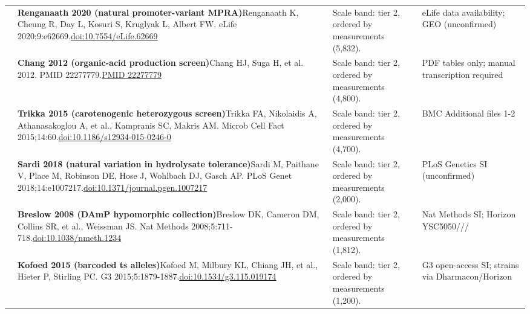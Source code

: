 \begin{landscape}
\begin{longtable}{@{}r@{\hspace{4pt}} L{86mm} L{92mm} L{62mm}@{}}
 & \textbf{Renganaath 2020 (natural promoter-variant MPRA)}\newline Renganaath K, Cheung R, Day L, Kosuri S, Kruglyak L, Albert FW. eLife 2020;9:e62669.\newline \href{https://doi.org/10.7554/eLife.62669}{doi:10.7554/\allowbreak eLife.62669} & Scale band: tier 2, ordered by measurements (5,832). & eLife data availability; GEO (unconfirmed) \\
 & \textbf{Chang 2012 (organic-acid production screen)}\newline Chang HJ, Suga H, et al. 2012. PMID 22277779.\newline \href{https://pubmed.ncbi.nlm.nih.gov/22277779/}{PMID 22277779} & Scale band: tier 2, ordered by measurements (4,800). & PDF tables only; manual transcription required \\
 & \textbf{Trikka 2015 (carotenogenic heterozygous screen)}\newline Trikka FA, Nikolaidis A, Athanasakoglou A, et al., Kampranis SC, Makris AM. Microb Cell Fact 2015;14:60.\newline \href{https://doi.org/10.1186/s12934-015-0246-0}{doi:10.1186/\allowbreak s12934-015-0246-0} & Scale band: tier 2, ordered by measurements (4,700). & BMC Additional files 1-2 \\
 & \textbf{Sardi 2018 (natural variation in hydrolysate tolerance)}\newline Sardi M, Paithane V, Place M, Robinson DE, Hose J, Wohlbach DJ, Gasch AP. PLoS Genet 2018;14:e1007217.\newline \href{https://doi.org/10.1371/journal.pgen.1007217}{doi:10.1371/\allowbreak journal.pgen.1007217} & Scale band: tier 2, ordered by measurements (2,000). & PLoS Genetics SI (unconfirmed) \\
 & \textbf{Breslow 2008 (DAmP hypomorphic collection)}\newline Breslow DK, Cameron DM, Collins SR, et al., Weissman JS. Nat Methods 2008;5:711-718.\newline \href{https://doi.org/10.1038/nmeth.1234}{doi:10.1038/\allowbreak nmeth.1234} & Scale band: tier 2, ordered by measurements (1,812). & Nat Methods SI; Horizon YSC5050/// \\
 & \textbf{Kofoed 2015 (barcoded ts alleles)}\newline Kofoed M, Milbury KL, Chiang JH, et al., Hieter P, Stirling PC. G3 2015;5:1879-1887.\newline \href{https://doi.org/10.1534/g3.115.019174}{doi:10.1534/\allowbreak g3.115.019174} & Scale band: tier 2, ordered by measurements (1,200). & G3 open-access SI; strains via Dharmacon/\allowbreak Horizon \\

\end{longtable}
\end{landscape}
